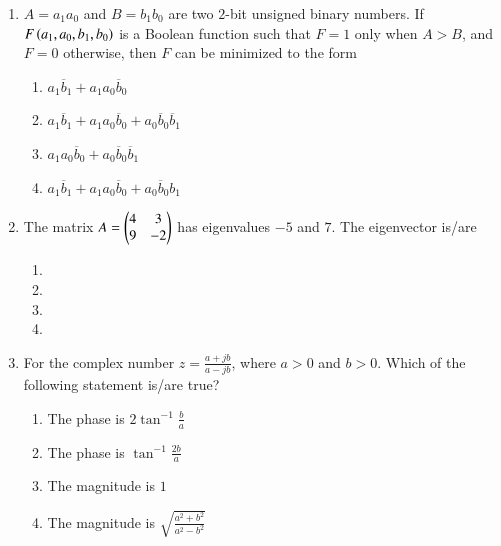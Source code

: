 \documentclass[journal,12pt,onecolumn]{IEEEtran}
\theoremstyle{remark}
\begin{document}
\begin{enumerate}
\item $A = a_1 a_0$ and $B = b_1 b_0$ are two $2$-bit unsigned binary numbers. If $F\left(a_1, a_0, b_1, b_0\right)$ is a Boolean function such that $F = 1$ only when $A > B$, and $F = 0$ otherwise, then $F$ can be minimized to the form \underline{\hspace{2cm}}

\hfill{}
\begin{enumerate}
\item $a_1 \overline{b}_1 + a_1 a_0 \overline{b}_0$
\item $a_1 \overline{b}_1 + a_1 a_0 \overline{b}_0 + a_0 \overline{b}_0 \overline{b}_1$
\item $a_1 a_0 \overline{b}_0 + a_0 \overline{b}_0 \overline{b}_1$
\item $a_1 \overline{b}_1 + a_1 a_0 \overline{b}_0 + a_0 \overline{b}_0 b_1$
\end{enumerate}

\item The matrix $A = \begin{pmatrix}4 & 3 \\ 9 & -2\end{pmatrix}$ has eigenvalues $-5$ and $7$. The eigenvector is/are \underline{\hspace{2cm}}

\hfill{}
\begin{enumerate}
\item {}
\item {}
\item {}
\item {}
\end{enumerate}

\item For the complex number $z = \frac{a+jb}{a-jb}$, where $a>0$ and $b>0$. Which of the following statement is/are true?

\hfill{}
\begin{enumerate}
\item The phase is $2 \tan^{-1} \frac{b}{a}$
\item The phase is $\tan^{-1} \frac{2b}{a}$
\item The magnitude is $1$
\item The magnitude is $\sqrt{\frac{a^2+b^2}{a^2-b^2}}$
\end{enumerate}


\end{enumerate}
\end{document}
